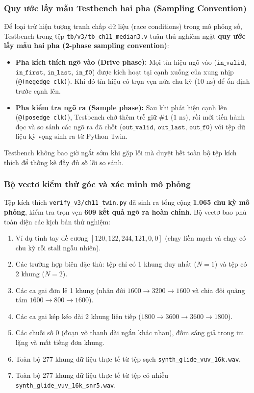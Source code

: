 \subsubsection*{Quy ước lấy mẫu Testbench hai pha (Sampling Convention)}
Để loại trừ hiện tượng tranh chấp dữ liệu (race conditions) trong mô phỏng số, Testbench trong tệp \texttt{tb/v3/tb\_ch11\_median3.v} tuân thủ nghiêm ngặt \textbf{quy ước lấy mẫu hai pha (2-phase sampling convention)}:
\begin{itemize}
    \item \textbf{Pha kích thích ngõ vào (Drive phase):} Mọi tín hiệu ngõ vào ($\texttt{in\_valid}$, $\texttt{in\_first}$, $\texttt{in\_last}$, $\texttt{in\_f0}$) được kích hoạt tại cạnh xuống của xung nhịp (\texttt{@(negedge clk)}). Khi đó tín hiệu có trọn vẹn nửa chu kỳ ($10\text{ ns}$) để ổn định trước cạnh lên.
    \item \textbf{Pha kiểm tra ngõ ra (Sample phase):} Sau khi phát hiện cạnh lên (\texttt{@(posedge clk)}), Testbench chờ thêm trễ giữ $\texttt{\#1}$ ($1\text{ ns}$), rồi mới tiến hành đọc và so sánh các ngõ ra đã chốt ($\texttt{out\_valid}$, $\texttt{out\_last}$, $\texttt{out\_f0}$) với tệp dữ liệu kỳ vọng sinh ra từ Python Twin.
\end{itemize}
Testbench không bao giờ ngắt sớm khi gặp lỗi mà duyệt hết toàn bộ tệp kích thích để thống kê đầy đủ số lỗi so sánh.

\subsubsection*{Bộ vectơ kiểm thử góc và xác minh mô phỏng}
Tệp kích thích \texttt{verify\_v3/ch11\_twin.py} đã sinh ra tổng cộng \textbf{1.065 chu kỳ mô phỏng}, kiểm tra trọn vẹn \textbf{609 kết quả ngõ ra hoàn chỉnh}. Bộ vectơ bao phủ toàn diện các kịch bản thử nghiệm:
\begin{enumerate}
    \item Ví dụ tính tay đề cương $[120, 122, 244, 121, 0, 0]$ (chạy liền mạch và chạy có chu kỳ rỗi stall ngẫu nhiên).
    \item Các trường hợp biên đặc thù: tệp chỉ có 1 khung duy nhất ($N = 1$) và tệp có 2 khung ($N = 2$).
    \item Các ca gai đơn lẻ 1 khung (nhân đôi $1600 \to 3200 \to 1600$ và chia đôi quãng tám $1600 \to 800 \to 1600$).
    \item Các ca gai kép kéo dài 2 khung liên tiếp ($1800 \to 3600 \to 3600 \to 1800$).
    \item Các chuỗi số 0 (đoạn vô thanh dài ngắn khác nhau), đốm sáng giả trong im lặng và mất tiếng đơn khung.
    \item Toàn bộ 277 khung dữ liệu thực tế từ tệp sạch \texttt{synth\_glide\_vuv\_16k.wav}.
    \item Toàn bộ 277 khung dữ liệu thực tế từ tệp có nhiễu \texttt{synth\_glide\_vuv\_16k\_snr5.wav}.
\end{enumerate}


